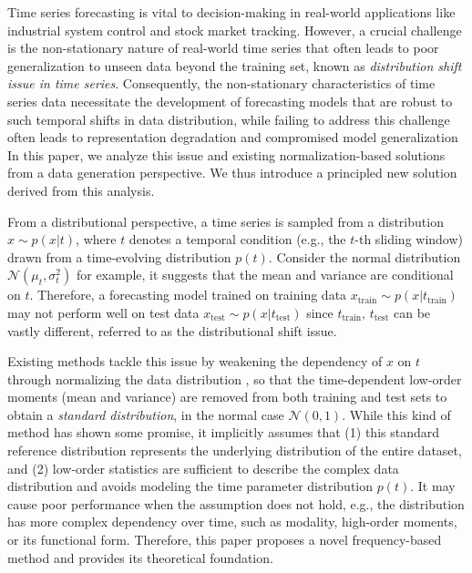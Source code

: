 \documentclass[sigconf,anonymous,review]{acmart}
\begin{document}




Time series forecasting is vital to decision-making in real-world applications like industrial system control and stock market tracking.
However, a crucial challenge is the non-stationary nature of real-world time series that often leads to poor generalization to unseen data beyond the training set, known as \textit{distribution shift issue in time series}.
Consequently, the non-stationary characteristics of time series data necessitate the development of forecasting models that are robust to such temporal shifts in data distribution, while failing to address this challenge often leads to representation degradation and compromised model generalization
In this paper, we analyze this issue and existing normalization-based solutions~\citep{kim2021RevIN,fan2023dish,liu2023SAN,han2024sin} from a data generation perspective.
We thus introduce a principled new solution derived from this analysis.




From a distributional perspective, a time series is sampled from a distribution $x \sim p(x|t)$, where $t$ denotes a temporal condition (e.g., the $t$-th sliding window) drawn from a time-evolving distribution $p(t)$.
Consider the normal distribution $\mathcal{N}(\mu_t, \sigma^2_t)$ for example, it suggests that the mean and variance are conditional on $t$.
Therefore, a forecasting model trained on training data $x_\text{train} \sim p(x|t_\text{train})$ may not perform well on test data $x_\text{test} \sim p(x|t_\text{test})$ since $t_\text{train}, \,t_\text{test}$ can be vastly different, referred to as the distributional shift issue.


Existing methods tackle this issue by weakening the dependency of $x$ on $t$ through normalizing the data distribution \citep{kim2021RevIN,liu2023SAN,fan2023dish,han2024sin}, so that the time-dependent low-order moments (mean and variance) are removed from both training and test sets to obtain a \textit{standard distribution}, in the normal case $\mathcal{N}(0, 1)$.
While this kind of method has shown some promise, it implicitly assumes that (1)  this standard reference distribution represents the underlying distribution of the entire dataset, and (2) low-order statistics are sufficient to describe the complex data distribution and avoids modeling the time parameter distribution $p(t)$.
It may cause poor performance when the assumption does not hold, e.g., the distribution has more complex dependency over time, such as modality, high-order moments, or its functional form.
Therefore, this paper proposes a novel frequency-based method and provides its theoretical foundation.
\end{document}
